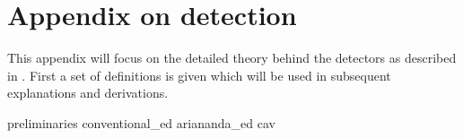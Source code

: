 \documentclass[a4paper, openany, oneside]{memoir}
\begin{document}
\chapter{Appendix on detection}\label{app:detector}
This appendix will focus on the detailed theory behind the detectors as described in . First a set of definitions is given which will be
used in subsequent explanations and derivations.

{preliminaries}
{conventional_ed}
{ariananda_ed}
{cav}
\end{document}
